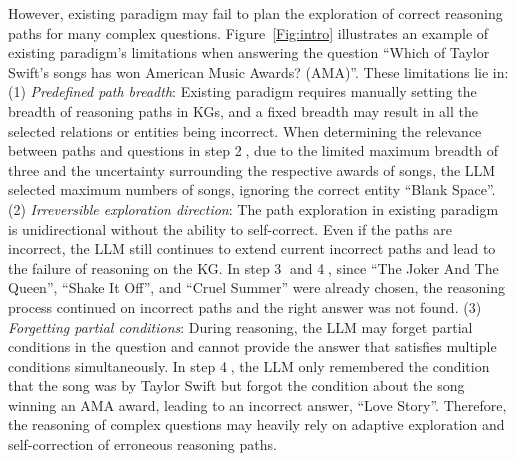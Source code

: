 \documentclass{article}
\begin{document}
However, existing paradigm may fail to plan the exploration of correct reasoning paths for many complex questions.
Figure~\ref{Fig:intro} illustrates an example of existing paradigm's limitations when answering the question ``Which of Taylor Swift's songs has won American Music Awards? (AMA)''. 
These limitations lie in:
(1) \textit{Predefined path breadth}: Existing paradigm requires manually setting the breadth of reasoning paths in KGs, and a fixed breadth may result in all the selected relations or entities being incorrect.
When determining the relevance between paths and questions in step \textcircled{2}, due to the limited maximum breadth of three and the uncertainty surrounding the respective awards of songs, the LLM selected maximum numbers of songs, ignoring the correct entity ``Blank Space''.
(2) \textit{Irreversible exploration direction}: 
The path exploration in existing paradigm is unidirectional without the ability to self-correct.
Even if the paths are incorrect, the LLM still continues to extend current incorrect paths and lead to the failure of reasoning on the KG.
In step \textcircled{3} and \textcircled{4}, since ``The Joker And The Queen'', ``Shake It Off'', and ``Cruel Summer'' were already chosen, the reasoning process continued on incorrect paths and the right answer was not found.
(3) \textit{Forgetting partial conditions}: 
During reasoning, the LLM may forget partial conditions in the question and cannot provide the answer that satisfies multiple conditions simultaneously.
In step \textcircled{4}, the LLM only remembered the condition that the song was by Taylor Swift but forgot the condition about the song winning an AMA award, leading to an incorrect answer, ``Love Story''.
Therefore, the reasoning of complex questions may heavily rely on adaptive exploration and self-correction of erroneous reasoning paths.
\end{document}
